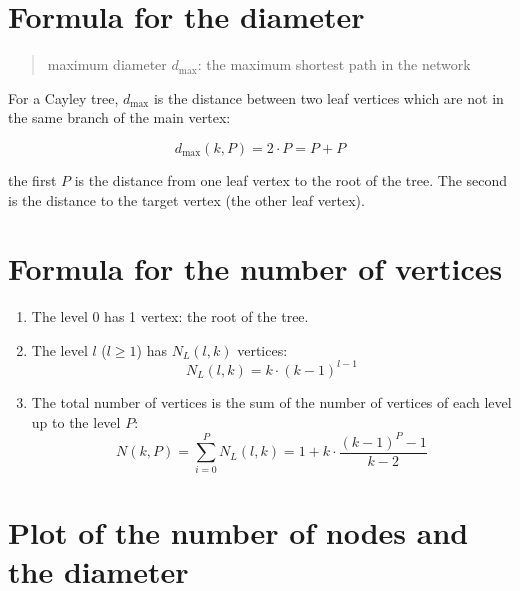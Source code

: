 \documentclass{article}
\newcommand{\Sum}[3]{\ensuremath{\displaystyle\sum\limits_{#1}^{#2} #3}}
\begin{document}
\section{Formula for the diameter}

\begin{quotation}
    maximum diameter $d_{\max}$: the maximum shortest path in the network
\end{quotation}

For a Cayley tree, $d_{\max}$ is the distance between two leaf vertices which are not in the same branch of the main vertex:

\begin{equation}
    d_{\max}(k, P) = 2 \cdot P = P + P
\end{equation}

the first $P$ is the distance from one leaf vertex to the root of the tree. The second is the distance to the target vertex (the other leaf vertex).

\section{Formula for the number of vertices}

\begin{enumerate}
    \item The level 0 has 1 vertex: the root of the tree.
    \item The level $l$ ($l \geq 1$) has $N_L(l, k)$ vertices:
        \begin{equation}
            N_L(l, k) = k \cdot {\left(k - 1\right)}^{l - 1}
        \end{equation}
    \item The total number of vertices is the sum of the number of vertices of each level up to the level $P$:
        \begin{equation}
            N(k,P) = \Sum{i = 0}{P}{N_L(l,k)} = 1 + k \cdot \dfrac{{\left(k - 1\right)}^{P} - 1}{k - 2}
        \end{equation}
\end{enumerate}

\section{Plot of the number of nodes and the diameter}
\end{document}
